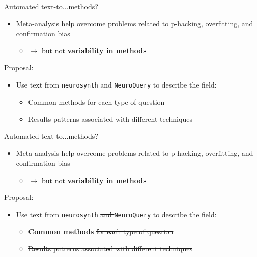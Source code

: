 \documentclass[aspectratio=169]{beamer}
\begin{document}
\begin{frame}{Automated text-to...methods?}
	\begin{itemize}
		\item Meta-analysis help overcome problems related to p-hacking, overfitting, and confirmation bias
		\begin{itemize}
			\item $\rightarrow$ but not \textbf{variability in methods}
		\end{itemize}

	\end{itemize}
	
	\vspace{3mm}
	
	\pause
	Proposal:
	
	\begin{itemize}
		\item Use text from \texttt{neurosynth} and \texttt{NeuroQuery} to describe the field:
		\begin{itemize}
			\item Common methods for each type of question
			\item Results patterns associated with different techniques
		\end{itemize}
	\end{itemize}
\end{frame}

\begin{frame}{Automated text-to...methods?}
	\begin{itemize}
		\item Meta-analysis help overcome problems related to p-hacking, overfitting, and confirmation bias
		\begin{itemize}
			\item $\rightarrow$ but not \textbf{variability in methods}
		\end{itemize}
		
	\end{itemize}
	
	\vspace{3mm}
	
	Proposal:
	
	\begin{itemize}
		\item Use text from \texttt{neurosynth} \sout{and \texttt{NeuroQuery}} to describe the field:
		\begin{itemize}
			\item \textbf{Common methods} \sout{for each type of question}
			\item \sout{Results patterns associated with different techniques}
		\end{itemize}
	\end{itemize}
\end{frame}
\end{document}

